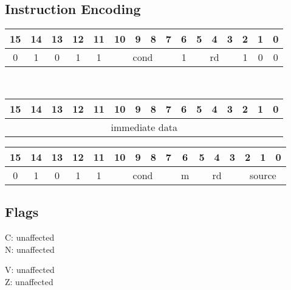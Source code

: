 \documentclass[11pt]{book}
\newcommand*{\encoding}[1]{\noindent
\begin{tabular}{|c|c|c|c|c|c|c|c|c|c|c|c|c|c|c|c|}
\multicolumn{1}{c}{15}&
\multicolumn{1}{c}{14}&
\multicolumn{1}{c}{13}&
\multicolumn{1}{c}{12}&
\multicolumn{1}{c}{11}&
\multicolumn{1}{c}{10}&
\multicolumn{1}{c}{9}&
\multicolumn{1}{c}{8}&
\multicolumn{1}{c}{7}&
\multicolumn{1}{c}{6}&
\multicolumn{1}{c}{5}&
\multicolumn{1}{c}{4}&
\multicolumn{1}{c}{3}&
\multicolumn{1}{c}{2}&
\multicolumn{1}{c}{1}&
\multicolumn{1}{c}{0}\\\hline
#1\\\hline
\end{tabular}}
\begin{document}
\subsection*{Instruction Encoding}
\encoding{0&1&0&1&1%
&\multicolumn{4}{|c|}{cond}%
&1&\multicolumn{3}{|c|}{rd}&1&0&0}\\\null\qquad
\encoding{\multicolumn{16}{|c|}{immediate data}}

\vspace{2\baselineskip}
\encoding{0&1&0&1&1%
&\multicolumn{4}{|c|}{cond}%
&m&\multicolumn{3}{|c|}{rd}&\multicolumn{3}{|c|}{source}}

\subsection*{Flags}
\begin{multicols}{2}\noindent
  C: unaffected\\
  N: unaffected

  \columnbreak\noindent
  V: unaffected\\
  Z: unaffected
\end{multicols}
\end{document}

